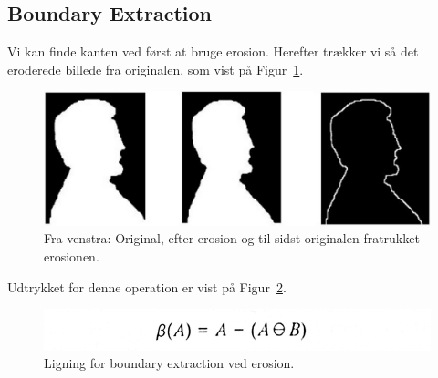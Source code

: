 \subsection{Boundary Extraction}

Vi kan finde kanten ved først at bruge erosion. Herefter trækker vi så det eroderede billede fra originalen, som vist på Figur~\ref{fig:boundary-extraction-by-erosion}.

\begin{figure}[H]
	\centering
	\includegraphics[width=0.9\linewidth]{figs/spm03/boundary-extraction-by-erosion}
	\caption{Fra venstra: Original, efter erosion og til sidst originalen fratrukket erosionen.}
	\label{fig:boundary-extraction-by-erosion}
\end{figure}

Udtrykket for denne operation er vist på Figur~\ref{fig:edgedetektioneq}. 

\begin{figure}[H]
	\centering
	\includegraphics[width=0.55\linewidth]{figs/spm03/edgedetektioneq}
	\caption{Ligning for boundary extraction ved erosion.}
	\label{fig:edgedetektioneq}
\end{figure}
